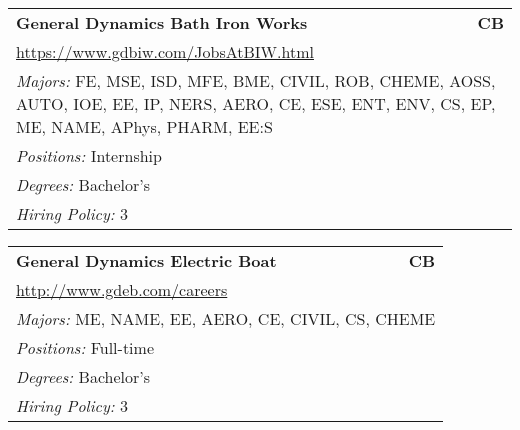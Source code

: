 \documentclass[twoside]{article}
\begin{document}
\begin{center}
\begin{multicols}{3}
\begin{FlushLeft}
\begin{minipage}{\columnwidth}
\end{minipage}
 
\begin{minipage}{\columnwidth}\begin{tabularx}{.95\columnwidth}{Xr}
                 {\Large\bf General Dynamics Bath Iron Works} & {\Large\bf CB}\\
    \multicolumn{2}{p{.95\columnwidth}}{\url{https://www.gdbiw.com/JobsAtBIW.html}}\\
    \multicolumn{2}{p{.95\columnwidth}}{\emph{Majors:} FE, MSE, ISD, MFE, BME, CIVIL, ROB, CHEME, AOSS, AUTO, IOE, EE, IP, NERS, AERO, CE, ESE, ENT, ENV, CS, EP, ME, NAME, APhys, PHARM, EE:S}\\
    \multicolumn{2}{p{.95\columnwidth}}{\emph{Positions:} Internship}\\
    \multicolumn{2}{p{.95\columnwidth}}{\emph{Degrees:} Bachelor's}\\
    \multicolumn{2}{p{.95\columnwidth}}{\emph{Hiring Policy:} 3}\\
    \end{tabularx}
    
\end{minipage}
 
\begin{minipage}{\columnwidth}\begin{tabularx}{.95\columnwidth}{Xr}
                 {\Large\bf General Dynamics Electric Boat} & {\Large\bf CB}\\
    \multicolumn{2}{p{.95\columnwidth}}{\url{http://www.gdeb.com/careers}}\\
    \multicolumn{2}{p{.95\columnwidth}}{\emph{Majors:} ME, NAME, EE, AERO, CE, CIVIL, CS, CHEME}\\
    \multicolumn{2}{p{.95\columnwidth}}{\emph{Positions:} Full-time}\\
    \multicolumn{2}{p{.95\columnwidth}}{\emph{Degrees:} Bachelor's}\\
    \multicolumn{2}{p{.95\columnwidth}}{\emph{Hiring Policy:} 3}\\
    \end{tabularx}
    
\end{minipage}
 

\end{FlushLeft}
\end{multicols}
\end{center}
\end{document}
